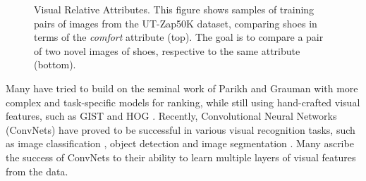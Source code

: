 \begin{figure}
{}
\caption{Visual Relative Attributes. This figure shows samples of training pairs of images from the UT-Zap50K dataset, comparing shoes in terms of the \textit{comfort} attribute (top). The goal is to compare a pair of two novel images of shoes, respective to the same attribute (bottom).}
\label{fig.1}
\end{figure}

Many have tried to build on the seminal work of Parikh and Grauman \cite{parikh2011} with more complex and task-specific models for ranking, while still using hand-crafted visual features, such as GIST \cite{Aude01} and HOG \cite{hog}. Recently, Convolutional Neural Networks (ConvNets) have proved to be successful in various visual recognition tasks, such as image classification \cite{Krizhevsky2012ImageNetCW}, object detection \cite{RCNN} and image segmentation \cite{fullyconv}. Many ascribe the success of ConvNets to their ability to learn multiple layers of visual features from the data. 

